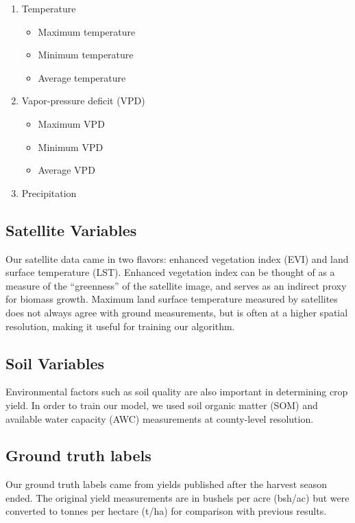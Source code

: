 \documentclass[letterpaper]{article}
\begin{document}
\begin{enumerate}
    \item Temperature
    \begin{itemize}
        \item Maximum temperature
        \item Minimum temperature
        \item Average temperature
    \end{itemize}
    \item Vapor-pressure deficit (VPD)
    \begin{itemize}
        \item Maximum VPD
        \item Minimum VPD
        \item Average VPD
    \end{itemize}
    \item Precipitation
\end{enumerate}

\subsection{Satellite Variables}

Our satellite data came in two flavors: enhanced vegetation index (EVI) and land surface temperature (LST). Enhanced vegetation index can be thought of as a measure of the ``greenness'' of the satellite image, and serves as an indirect proxy for biomass growth. Maximum land surface temperature measured by satellites does not always agree with ground measurements, but is often at a higher spatial resolution, making it useful for training our algorithm.

\subsection{Soil Variables}

Environmental factors such as soil quality are also important in determining crop yield. In order to train our model, we used soil organic matter (SOM) and available water capacity (AWC) measurements at county-level resolution.

\subsection{Ground truth labels}

Our ground truth labels came from yields published after the harvest season ended. The original yield measurements are in bushels per acre (bsh/ac) but were converted to tonnes per hectare (t/ha) for comparison with previous results.
\end{document}
